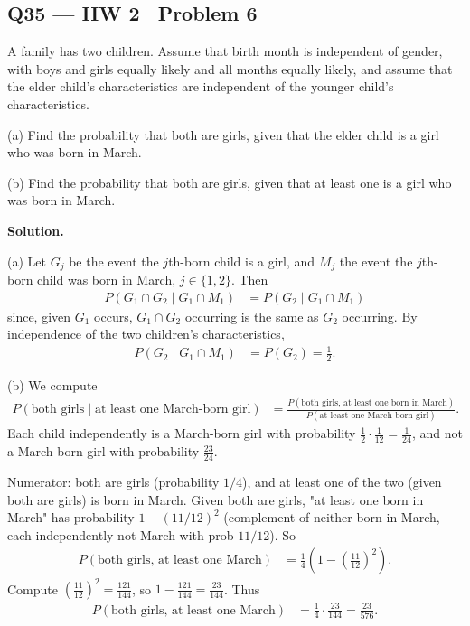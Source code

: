 \documentclass[11pt]{article}
\begin{document}
\subsection*{Q35 --- HW 2 \textperiodcentered\ Problem 6}
\begin{qbox}
A family has two children. Assume that birth month is independent of gender, with boys and girls equally likely and all months equally likely, and assume that the elder child's characteristics are independent of the younger child's characteristics.

(a) Find the probability that both are girls, given that the elder child is a girl who was born in March.

(b) Find the probability that both are girls, given that at least one is a girl who was born in March.
\end{qbox}
\textbf{Solution.}

(a) Let $G_j$ be the event the $j$th-born child is a girl, and $M_j$ the event the $j$th-born child was born in March, $j\in\{1,2\}$. Then
\begin{align*}
P(G_1\cap G_2 \mid G_1 \cap M_1) &= P(G_2 \mid G_1\cap M_1)
\end{align*}
since, given $G_1$ occurs, $G_1\cap G_2$ occurring is the same as $G_2$ occurring. By independence of the two children's characteristics,
\begin{align*}
P(G_2 \mid G_1\cap M_1) &= P(G_2) = \frac12.
\end{align*}

(b) We compute
\begin{align*}
P(\text{both girls}\mid \text{at least one March-born girl}) &= \frac{P(\text{both girls, at least one born in March})}{P(\text{at least one March-born girl})}.
\end{align*}
Each child independently is a March-born girl with probability $\tfrac12\cdot\tfrac1{12} = \tfrac{1}{24}$, and not a March-born girl with probability $\tfrac{23}{24}$.

Numerator: both are girls (probability $1/4$), and at least one of the two (given both are girls) is born in March. Given both are girls, "at least one born in March" has probability $1-(11/12)^2$ (complement of neither born in March, each independently not-March with prob $11/12$). So
\begin{align*}
P(\text{both girls, at least one March}) &= \frac14\left(1-\left(\frac{11}{12}\right)^2\right).
\end{align*}
Compute $\left(\tfrac{11}{12}\right)^2 = \tfrac{121}{144}$, so $1-\tfrac{121}{144} = \tfrac{23}{144}$. Thus
\begin{align*}
P(\text{both girls, at least one March}) &= \frac14\cdot\frac{23}{144} = \frac{23}{576}.
\end{align*}
\end{document}
